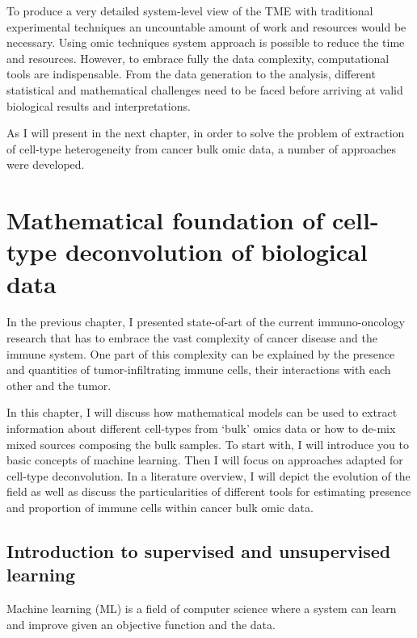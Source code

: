 \documentclass[12pt,]{book}
\theoremstyle{definition}
\theoremstyle{definition}
\theoremstyle{definition}
\theoremstyle{remark}
\begin{document}
To produce a very detailed system-level view of the TME with traditional
experimental techniques an uncountable amount of work and resources
would be necessary. Using omic techniques system approach is possible to
reduce the time and resources. However, to embrace fully the data
complexity, computational tools are indispensable. From the data
generation to the analysis, different statistical and mathematical
challenges need to be faced before arriving at valid biological results
and interpretations.

As I will present in the next chapter, in order to solve the problem of
extraction of cell-type heterogeneity from cancer bulk omic data, a
number of approaches were developed.

\hypertarget{methods}{%
\chapter{Mathematical foundation of cell-type deconvolution of
biological data}\label{methods}}


In the previous chapter, I presented state-of-art of the current
immuno-oncology research that has to embrace the vast complexity of
cancer disease and the immune system. One part of this complexity can be
explained by the presence and quantities of tumor-infiltrating immune
cells, their interactions with each other and the tumor.

In this chapter, I will discuss how mathematical models can be used to
extract information about different cell-types from `bulk' omics data or
how to de-mix mixed sources composing the bulk samples. To start with, I
will introduce you to basic concepts of machine learning. Then I will
focus on approaches adapted for cell-type deconvolution. In a literature
overview, I will depict the evolution of the field as well as discuss
the particularities of different tools for estimating presence and
proportion of immune cells within cancer bulk omic data.

\hypertarget{introduction-to-supervised-and-unsupervised-learning}{%
\section{Introduction to supervised and unsupervised
learning}\label{introduction-to-supervised-and-unsupervised-learning}}

Machine learning (ML) is a field of computer science where a system can
learn and improve given an objective function and the data.
\end{document}
